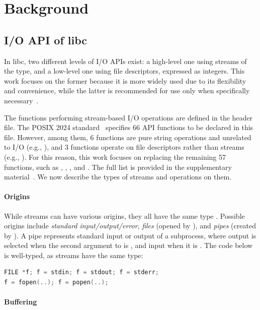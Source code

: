 \section{Background}
\label{sec:background}

\subsection{I/O API of libc}
\label{sec:background:c}

In libc, two different levels of I/O APIs exist:
%
a high-level one using streams of the  type, and a low-level one using
file descriptors, expressed as integers.
%
This work focuses on the former because it is more widely used due to its
flexibility and convenience, while the latter is recommended for use only when
specifically necessary~\cite{glibc}.

The functions performing stream-based I/O operations are defined in the
 header file.
%
The POSIX 2024 standard~\cite{posix2024} specifies 66 API functions to be
declared in this file.
%
However, among them, 6 functions are pure string operations and unrelated to I/O
(e.g., ),
%
and 3 functions operate on file descriptors rather than streams (e.g.,
).
%
For this reason, this work focuses on replacing the remaining 57 functions, such
as , , , and .
%
The full list is provided in the supplementary material~\cite{supp}.
%
We now describe the types of streams and operations on them.

\paragraph{Origins}

While streams can have various origins, they all have the same type .
%
Possible origins include \emph{standard input/output/error}, \emph{files}
(opened by ), and \emph{pipes} (created by ).
%
A pipe represents standard input or output of a subprocess, where output is
selected when the second argument to  is , and input
when it is .
%
The code below is well-typed, as streams have the same type:

\begin{lstlisting}[language=C]
FILE *f; f = stdin; f = stdout; f = stderr;
f = fopen(..); f = popen(..);
\end{lstlisting}

\paragraph{Buffering}

